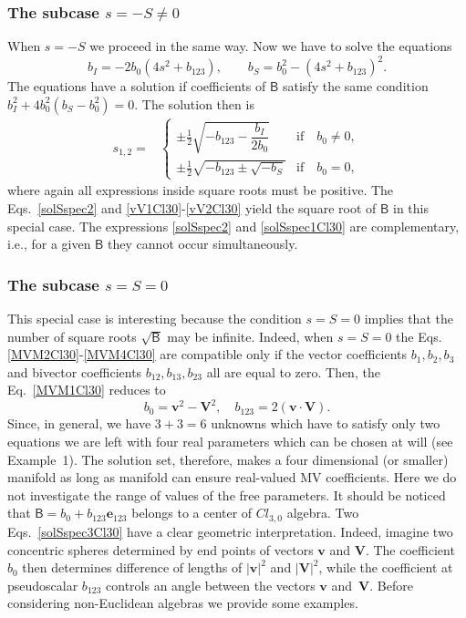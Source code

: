 \documentclass{birkjour}
\newcommand{\e}[1]{\mathbf{e}_{#1}} %
\newcommand{\cl}[2]{\ensuremath{\mathit{Cl}_{#1,#2}}}
\def\B{\mathsf{B}}
\def\e#1{\mathbf{e}_{#1}} %
\newcommand{\bv}{\ensuremath{\mathbf{v}}}
\newcommand{\bV}{\ensuremath{\mathbf{V}}}
\begin{document}
\subsubsection{The subcase $s = -S\neq 0$}
When $s=-S$ we proceed in the same way.  Now we have to solve
the equations
\begin{equation}\label{sysAspec}
 b_I=-2b_0 (4 s^2+ b_{123}),\qquad
 b_S=b_0^2-(4 s^2+b_{123})^2.
\end{equation}
The equations have a solution if coefficients of $\B$ satisfy the
same condition $b_{I}^2+4 b_0^2(b_S- b_0^2)=0$. The solution then
is
\begin{equation}\begin{split}\label{solSspec2}
s_{1,2} =&\begin{cases}
\pm\tfrac12\sqrt{-b_{123}-\dfrac{b_I}{2 b_0}} & \textrm{if}\quad b_0\neq  0,\\
\pm\tfrac12\sqrt{-b_{123}\pm\sqrt{-b_S}} & \textrm{if}\quad b_0 =  0,
  \end{cases}
\end{split}\end{equation}
where again all expressions inside square roots must  be positive.
The Eqs.~\eqref{solSspec2} and \eqref{vV1Cl30}-\eqref{vV2Cl30}
yield the square root of $\B$ in this special case. The
expressions \eqref{solSspec2} and \eqref{solSspec1Cl30} are
complementary, i.e., for a given $\B$ they cannot
 occur simultaneously.

\subsubsection{The subcase $s = S = 0$}
This special case is interesting because the condition $s = S = 0$
implies that the number of square roots $\sqrt{\B}$ may be
infinite. Indeed, when $s = S = 0$ the Eqs.
\eqref{MVM2Cl30}-\eqref{MVM4Cl30} are compatible only if the
vector coefficients $b_1, b_2, b_3$ and bivector coefficients
$b_{12}, b_{13}, b_{23}$ all are equal to zero. Then, the
Eq.~\eqref{MVM1Cl30} reduces to
\begin{equation}\label{solSspec3Cl30}
b_0=\bv^2-\bV^2,\quad b_{123}=2(\bv\cdot\bV).
\end{equation}
Since, in general, we have $3+3=6$ unknowns which have to satisfy
only two equations we are left with four real parameters which can
be chosen at will (see Example~1). The solution set, therefore,
makes a four dimensional (or smaller) manifold as long as manifold
can ensure real-valued MV coefficients. Here we do not investigate
the range of values of the free parameters. It should be noticed
that  $\B = b_0+b_{123}\e{123}$ belongs to a center of \cl{3}{0}
algebra. Two Eqs.~\eqref{solSspec3Cl30} have a clear geometric
interpretation. Indeed, imagine two concentric spheres determined
by end points of vectors $\bv$ and $\bV$.  The coefficient $b_0$
then determines difference of lengths of $|\bv|^2$ and $|\bV|^2$,
while the coefficient at pseudoscalar $b_{123}$ controls an angle
between the vectors $\bv$ and~$\bV$. Before considering
non-Euclidean algebras we provide some examples.
%
\end{document}
